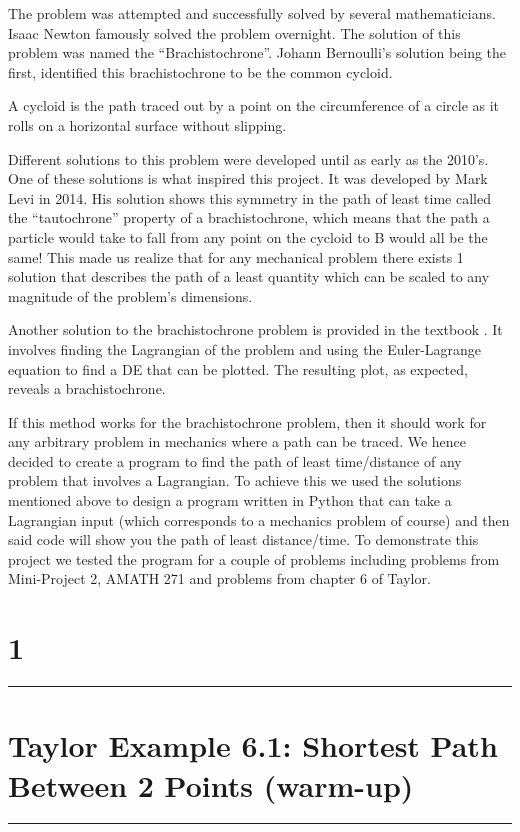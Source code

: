 \documentclass[hidelinks, 11pt]{article}
\begin{document}
The problem was attempted and successfully solved by several mathematicians. Isaac Newton famously solved the problem overnight. The solution of this problem was named the “Brachistochrone”.  Johann Bernoulli’s solution being the first, identified this brachistochrone to be the common cycloid. 


A cycloid is the path traced out by a point on the circumference of a circle as it rolls on a horizontal surface without slipping. 

Different solutions to this problem were developed until as early as the 2010's. One of these solutions is what inspired this project. It was developed by Mark Levi \cite{Levi2014} in 2014. His solution shows this symmetry in the path of least time called the “tautochrone” property of a brachistochrone, which means that the path a particle would take to fall from any point on the cycloid to B would all be the same! This made us realize that for any mechanical problem there exists 1 solution that describes the path of a least quantity which can be scaled to any magnitude of the problem’s dimensions. 

Another solution to the brachistochrone problem is provided in the textbook \cite{Taylor2005}. It involves finding the Lagrangian of the problem and using the Euler-Lagrange equation to find a DE that can be plotted. The resulting plot, as expected, reveals a brachistochrone.

If this method works for the brachistochrone problem, then it should work for any arbitrary problem in mechanics where a path can be traced. 
We hence decided to create a program to find the path of least time/distance of any problem that involves a Lagrangian. To achieve this we used the solutions mentioned above to design a program written in Python that can take a Lagrangian input (which corresponds to a mechanics problem of course) and then said code will show you the path of least distance/time. 
To demonstrate this project we tested the program for a couple of problems including problems from Mini-Project 2, AMATH 271 and problems from chapter 6 of Taylor.

\newpage

\begin{center}
  \section*{1}
  \noindent\rule{16cm}{0.4pt}
  \section*{Taylor Example 6.1: Shortest Path Between 2 Points (warm-up)} %
  \noindent\rule{16cm}{0.4pt}
\end{center}
\end{document}
